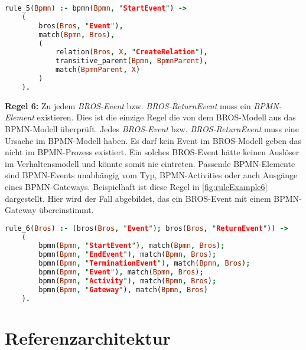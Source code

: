 \begin{lstlisting}[language=Prolog, caption=Formalisierung der Regel 5, label=lst:rule_5]
rule_5(Bpmn) :- bpmn(Bpmn, "StartEvent") ->
    (
        bros(Bros, "Event"),
        match(Bpmn, Bros),
        (
            relation(Bros, X, "CreateRelation"),
            transitive_parent(Bpmn, BpmnParent),
            match(BpmnParent, X)
        )
    ).
\end{lstlisting}

\textbf{Regel 6:}
Zu jedem \emph{BROS-Event} bzw. \emph{BROS-ReturnEvent} muss ein \emph{BPMN-Element} existieren.
Dies ist die einzige Regel die von dem BROS-Modell aus das BPMN-Modell überprüft.
Jedes \emph{BROS-Event} bzw. \emph{BROS-ReturnEvent} muss eine Ursache im BPMN-Modell haben.
Es darf kein Event im BROS-Modell geben das nicht im BPMN-Prozess existiert.
Ein solches BROS-Event hätte keinen Auslöser im Verhaltensmodell und könnte somit nie eintreten.
Passende BPMN-Elemente sind BPMN-Events unabhängig vom Typ, BPMN-Activities oder auch Ausgänge eines BPMN-Gateways.
Beispielhaft ist diese Regel in \cref{fig:ruleExample6} dargestellt.
Hier wird der Fall abgebildet, das ein BROS-Event mit einem BPMN-Gateway übereinstimmt.

\begin{lstlisting}[language=Prolog, caption=Formalisierung der Regel 6, label=lst:rule_6]
rule_6(Bros) :- (bros(Bros, "Event"); bros(Bros, "ReturnEvent")) ->
    (
        bpmn(Bpmn, "StartEvent"), match(Bpmn, Bros);
        bpmn(Bpmn, "EndEvent"), match(Bpmn, Bros);
        bpmn(Bpmn, "TerminationEvent"), match(Bpmn, Bros);
        bpmn(Bpmn, "Event"), match(Bpmn, Bros);
        bpmn(Bpmn, "Activity"), match(Bpmn, Bros);
        bpmn(Bpmn, "Gateway"), match(Bpmn, Bros)
    ).
\end{lstlisting}

\section{Referenzarchitektur}

